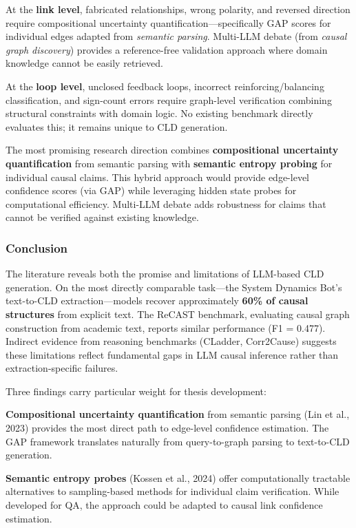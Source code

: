 At the \textbf{link level}, fabricated relationships, wrong polarity, and reversed direction require compositional uncertainty quantification---specifically GAP scores for individual edges adapted from \textit{semantic parsing}. Multi-LLM debate (from \textit{causal graph discovery}) provides a reference-free validation approach where domain knowledge cannot be easily retrieved.

At the \textbf{loop level}, unclosed feedback loops, incorrect reinforcing/balancing classification, and sign-count errors require graph-level verification combining structural constraints with domain logic. No existing benchmark directly evaluates this; it remains unique to CLD generation.

The most promising research direction combines \textbf{compositional uncertainty quantification} from semantic parsing with \textbf{semantic entropy probing} for individual causal claims. This hybrid approach would provide edge-level confidence scores (via GAP) while leveraging hidden state probes for computational efficiency. Multi-LLM debate adds robustness for claims that cannot be verified against existing knowledge.

\subsubsection{Conclusion}

The literature reveals both the promise and limitations of LLM-based CLD generation. On the most directly comparable task---the System Dynamics Bot's text-to-CLD extraction---models recover approximately \textbf{60\% of causal structures} from explicit text. The ReCAST benchmark, evaluating causal graph construction from academic text, reports similar performance (F1 = 0.477). Indirect evidence from reasoning benchmarks (CLadder, Corr2Cause) suggests these limitations reflect fundamental gaps in LLM causal inference rather than extraction-specific failures.

Three findings carry particular weight for thesis development:

\textbf{Compositional uncertainty quantification} from semantic parsing (Lin et al., 2023) provides the most direct path to edge-level confidence estimation. The GAP framework translates naturally from query-to-graph parsing to text-to-CLD generation.

\textbf{Semantic entropy probes} (Kossen et al., 2024) offer computationally tractable alternatives to sampling-based methods for individual claim verification. While developed for QA, the approach could be adapted to causal link confidence estimation.

